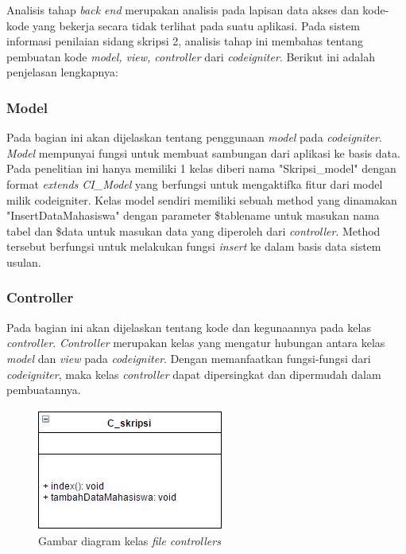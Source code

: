 	Analisis tahap \textit{back end} merupakan analisis pada lapisan data akses dan kode-kode yang bekerja secara tidak terlihat pada suatu aplikasi. Pada sistem informasi penilaian sidang skripsi 2, analisis tahap ini membahas tentang pembuatan kode \textit{model, view, controller} dari \textit{codeigniter}. Berikut ini adalah penjelasan lengkapnya:
	
	\subsubsection{Model}
	\label{subsub: modelCI}
	
	Pada bagian ini akan dijelaskan tentang penggunaan \textit{model} pada \textit{codeigniter}. \textit{Model} mempunyai fungsi untuk membuat sambungan dari aplikasi ke basis data. Pada penelitian ini hanya memiliki 1 kelas diberi nama "Skripsi\_model" dengan format \textit{extends CI\_Model} yang berfungsi untuk mengaktifka fitur dari model milik codeigniter. Kelas model sendiri memiliki sebuah method yang dinamakan "InsertDataMahasiswa" dengan parameter \$tablename untuk masukan nama tabel dan \$data untuk masukan data yang diperoleh dari \textit{controller}. Method tersebut berfungsi untuk melakukan fungsi \textit{insert} ke dalam basis data sistem usulan.
	
	\subsubsection{Controller}
	\label{subsub: controllerCI}
	
	Pada bagian ini akan dijelaskan tentang kode dan kegunaannya pada kelas \textit{controller}. \textit{Controller} merupakan kelas yang mengatur hubungan antara kelas \textit{model} dan \textit{view} pada \textit{codeigniter}. Dengan memanfaatkan fungsi-fungsi dari \textit{codeigniter}, maka kelas \textit{controller} dapat dipersingkat dan dipermudah dalam pembuatannya.
	\begin{figure}[H]
		\centering
		\includegraphics[scale= 1.0]{Gambar/C_skripsi}
		\caption {Gambar diagram kelas \textit{file controllers}}
		\label{fig:controllers}
	\end{figure}

